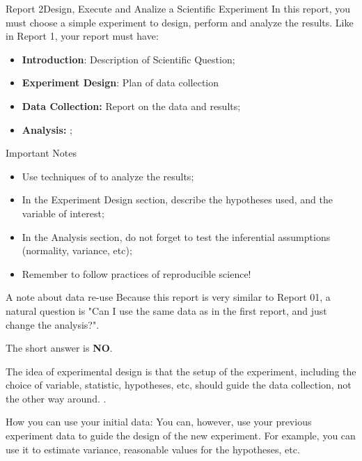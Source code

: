 \begin{frame}{Report 2}{Design, Execute and Analize a Scientific Experiment}
  In this report, you must choose a simple experiment to design, perform and analyze the results. Like in Report 1, your report must have:
  \begin{itemize}
    \item {\bf Introduction}: Description of Scientific Question;
    \item {\bf Experiment Design}: Plan of data collection 
    \item {\bf Data Collection:} Report on the data and results;
    \item {\bf Analysis:} ;
  \end{itemize}

  \begin{alertblock}{Important Notes}
    \begin{itemize}
      \item Use techniques of  to analyze the results;
      \item In the Experiment Design section, describe the hypotheses used, and the variable of interest;
      \item In the Analysis section, do not forget to test the inferential assumptions (normality, variance, etc);
      \item Remember to follow practices of reproducible science!
    \end{itemize}
  \end{alertblock}
\end{frame}

\begin{frame}{A note about data re-use}
  Because this report is very similar to Report 01, a natural question is "Can I use the same data as in the first report, and just change the analysis?".\bigskip

  \alert{The short answer is {\bf NO}}.\bigskip

  The idea of experimental design is that the setup of the experiment, including the choice of variable, statistic, hypotheses, etc, should guide the data collection, not the other way around. .

  \begin{exampleblock}{How you can use your initial data:}
    You can, however, use your previous experiment data to guide the design of the new experiment. For example, you can use it to estimate variance, reasonable values for the hypotheses, etc.
  \end{exampleblock}
\end{frame}

